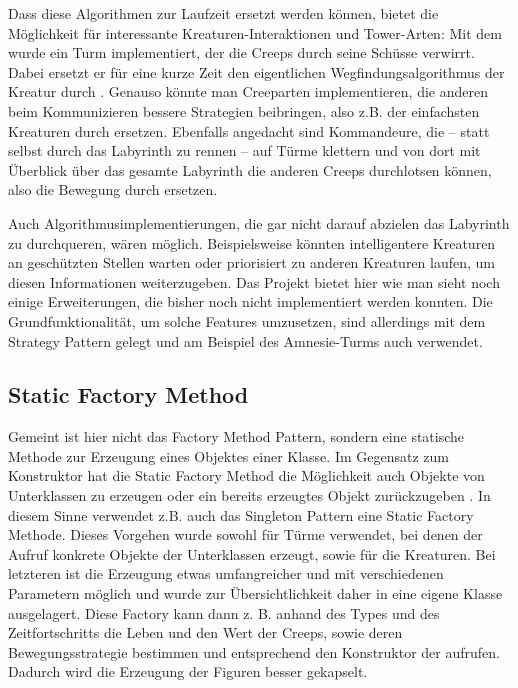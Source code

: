 Dass diese Algorithmen zur Laufzeit ersetzt werden können, bietet die Möglichkeit für interessante Kreaturen-Interaktionen und Tower-Arten: Mit dem  wurde ein Turm implementiert, der die Creeps durch seine Schüsse verwirrt. Dabei ersetzt er für eine kurze Zeit den eigentlichen Wegfindungsalgorithmus der Kreatur durch . Genauso könnte man Creeparten implementieren, die anderen beim Kommunizieren bessere Strategien beibringen, also z.B.  der einfachsten Kreaturen durch  ersetzen. Ebenfalls angedacht sind Kommandeure, die -- statt selbst durch das Labyrinth zu rennen -- auf Türme klettern und von dort mit Überblick über das gesamte Labyrinth die anderen Creeps durchlotsen können, also die Bewegung durch  ersetzen. 

Auch Algorithmusimplementierungen, die gar nicht darauf abzielen das Labyrinth zu durchqueren, wären möglich. Beispielsweise könnten intelligentere Kreaturen an geschützten Stellen warten oder priorisiert zu anderen Kreaturen laufen, um diesen Informationen weiterzugeben. Das Projekt bietet hier wie man sieht noch einige Erweiterungen, die bisher noch nicht implementiert werden konnten. Die Grundfunktionalität, um solche Features umzusetzen, sind allerdings mit dem Strategy Pattern gelegt und am Beispiel des Amnesie-Turms auch verwendet.


\subsection{Static Factory Method} %
\label{sub:static_factory_method}
Gemeint ist hier nicht das Factory Method Pattern, sondern eine statische Methode zur Erzeugung eines Objektes einer Klasse. Im Gegensatz zum Konstruktor hat die Static Factory Method die Möglichkeit auch Objekte von Unterklassen zu erzeugen oder ein bereits erzeugtes Objekt zurückzugeben \cite[5 ff.]{Bloch2008}. In diesem Sinne verwendet z.B. auch das Singleton Pattern eine Static Factory Methode. Dieses Vorgehen wurde sowohl für Türme verwendet, bei denen der Aufruf konkrete Objekte der Unterklassen erzeugt, sowie für die Kreaturen. Bei letzteren ist die Erzeugung etwas umfangreicher und mit verschiedenen Parametern möglich und wurde zur Übersichtlichkeit daher in eine eigene Klasse  ausgelagert. Diese Factory kann dann z. B. anhand des Types und des Zeitfortschritts die Leben und den Wert der Creeps, sowie deren Bewegungsstrategie bestimmen und entsprechend den Konstruktor der  aufrufen. Dadurch wird die Erzeugung der Figuren besser gekapselt.

